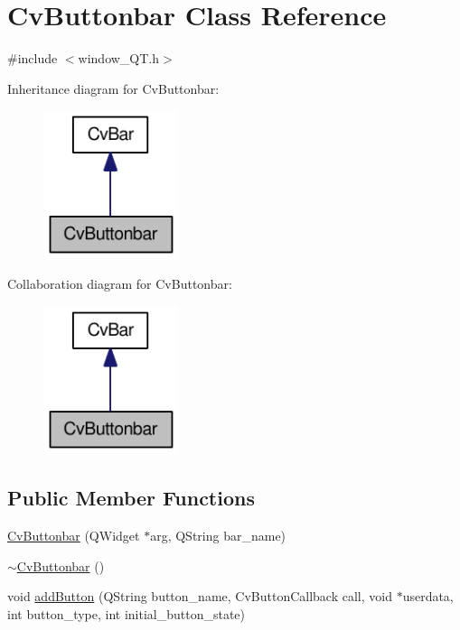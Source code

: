 \hypertarget{classCvButtonbar}{
\section{CvButtonbar Class Reference}
\label{classCvButtonbar}
}


{\ttfamily \#include $<$window\_\-QT.h$>$}



Inheritance diagram for CvButtonbar:\nopagebreak
\begin{figure}[H]
\begin{center}
\leavevmode
\includegraphics[width=112pt]{classCvButtonbar__inherit__graph}
\end{center}
\end{figure}


Collaboration diagram for CvButtonbar:\nopagebreak
\begin{figure}[H]
\begin{center}
\leavevmode
\includegraphics[width=112pt]{classCvButtonbar__coll__graph}
\end{center}
\end{figure}
\subsection*{Public Member Functions}
\begin{DoxyCompactItemize}
\item 
\hyperlink{classCvButtonbar_a2e242a93211a0ce57be59c9558c61487}{CvButtonbar} (QWidget $\ast$arg, QString bar\_\-name)
\item 
\hyperlink{classCvButtonbar_a53d7f1aa214a6f8b31b9e69c8806f49f}{$\sim$CvButtonbar} ()
\item 
void \hyperlink{classCvButtonbar_a9d85c6030793e2abeab43e300ed81687}{addButton} (QString button\_\-name, CvButtonCallback call, void $\ast$userdata, int button\_\-type, int initial\_\-button\_\-state)
\end{DoxyCompactItemize}


